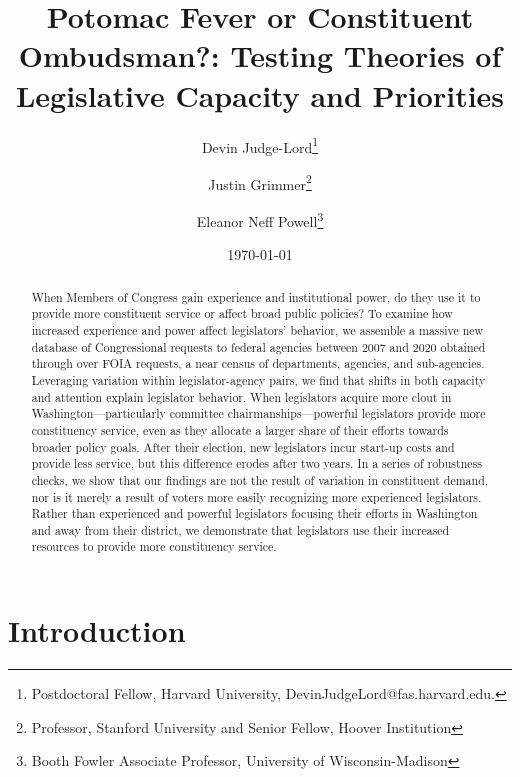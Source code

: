 \documentclass[12pt]{article}
\title{Potomac Fever or Constituent Ombudsman?: Testing Theories of Legislative Capacity and Priorities}
\author{Devin Judge-Lord\thanks{Postdoctoral Fellow, Harvard University, DevinJudgeLord@fas.harvard.edu.}\and Justin Grimmer\thanks{Professor, Stanford University and Senior Fellow, Hoover Institution} \and Eleanor Neff Powell\thanks{Booth Fowler Associate Professor, University of Wisconsin-Madison}}
\date{\today}
\begin{document}
\maketitle




\begin{abstract}
\noindent 
When Members of Congress gain experience and institutional power, do they use it to provide more constituent service or affect broad public policies? To examine how increased experience and power affect legislators' behavior, we assemble a massive new database of   Congressional requests to federal agencies between 2007 and 2020 obtained through over  FOIA requests, a near census of departments, agencies, and sub-agencies. Leveraging variation within legislator-agency pairs, we find that shifts in both capacity and attention explain legislator behavior. When legislators acquire more clout in Washington---particularly committee chairmanships---powerful legislators provide more constituency service, even as they allocate a larger share of their efforts towards broader policy goals. After their election, new legislators incur start-up costs and provide less service, but this difference erodes after two years. In a series of robustness checks, we show that our findings are not the result of variation in constituent demand, nor is it merely a result of voters more easily recognizing more experienced legislators. Rather than experienced and powerful legislators focusing their efforts in Washington and away from their district, we demonstrate that legislators use their increased resources to provide more constituency service. 
\end{abstract}



%

%

\newpage
\tableofcontents
\doublespacing
\section{Introduction}
\end{document}
